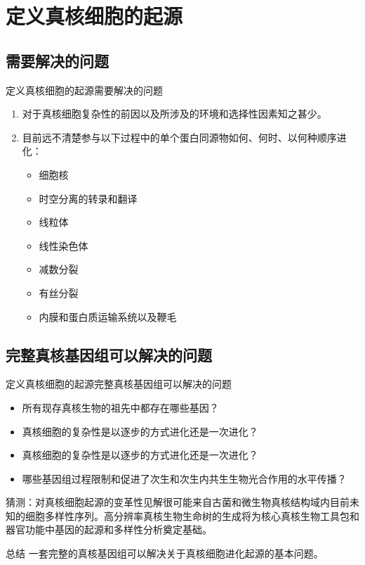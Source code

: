 \documentclass{beamer}
\begin{document}

	\section{定义真核细胞的起源}
	\subsection*{需要解决的问题}
	\begin{frame}{定义真核细胞的起源}{需要解决的问题}
		\begin{enumerate}
			\item 对于真核细胞复杂性的前因以及所涉及的环境和选择性因素知之甚少。
			\item 目前远不清楚参与以下过程中的单个蛋白同源物如何、何时、以何种顺序进化：
			\begin{itemize}
				\item 细胞核
				\item 时空分离的转录和翻译
				\item 线粒体
				\item 线性染色体
				\item 减数分裂
				\item 有丝分裂
				\item 内膜和蛋白质运输系统以及鞭毛
			\end{itemize}
		\end{enumerate}

	\end{frame}

	
\subsection*{完整真核基因组可以解决的问题}
\begin{frame}{定义真核细胞的起源}{完整真核基因组可以解决的问题}
	\begin{itemize}
		\item 所有现存真核生物的祖先中都存在哪些基因？
		\item 真核细胞的复杂性是以逐步的方式进化还是一次进化？
		\item 真核细胞的复杂性是以逐步的方式进化还是一次进化？
		\item 哪些基因组过程限制和促进了次生和次生内共生生物光合作用的水平传播？
	\end{itemize}

	猜测：对真核细胞起源的变革性见解很可能来自古菌和微生物真核结构域内目前未知的细胞多样性序列。高分辨率真核生物生命树的生成将为核心真核生物工具包和器官功能中基因的起源和多样性分析奠定基础。

	\begin{alertblock}{总结}
		一套完整的真核基因组可以解决关于真核细胞进化起源的基本问题。
	\end{alertblock}
\end{frame}
\end{document}

